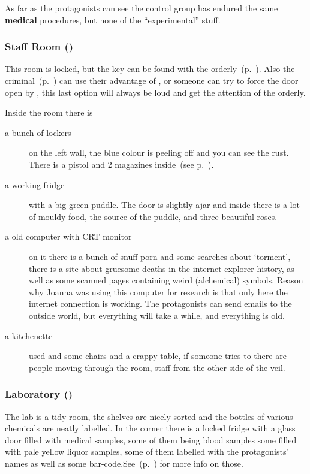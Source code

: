 \documentclass[bg-full]{resources/stylesheets/kult}
\begin{document}
As far as the protagonists can see the control group has endured the same \textbf{medical} procedures, but none of the
“experimental” stuff.

\subsubsection{Staff Room (\faLock)}%
\label{ssub:staff_room}

This room is locked, but the key can be found with the \hyperref[ssub:orderly]{orderly}~(p.~\pageref{ssub:orderly}).  Also the
criminal~(p.~\pageref{sub:the_criminal}) can use their advantage of , or someone can try to force the door open
by , this last option will always be loud and get the attention of the orderly.

Inside the room there is
\begin{description}
  \item[a bunch of lockers] on the left wall, the blue colour is peeling off and you can see the rust.  There is a pistol and 2
        magazines inside~(see p.~\pageref{pistol}).
  \item[a working fridge] with a big green puddle.  The door is slightly ajar and inside there is a lot of mouldy food,
        the source of the puddle, and three beautiful roses.
  \item[a old computer with CRT monitor] on it there is a bunch of snuff porn and some searches about ‘torment’, there is a
        site about gruesome deaths in the internet explorer history, as well as some scanned pages containing weird (alchemical)
        symbols.  Reason why Joanna was using this computer for research is that only here the internet connection is working.  The
        protagonists can send emails to the outside world, but everything will take a while, and everything is old.
  \item[a kitchenette] used and some chairs and a crappy table, if someone tries to 
        there are people moving through the room, staff from the other side of the veil.
\end{description}

\subsubsection{Laboratory (\faLock)}%
\label{ssub:laboratory}

The lab is a tidy room, the shelves are nicely sorted and the bottles of various chemicals are neatly labelled.  In the corner there
is a locked fridge with a glass door filled with medical samples, some of them being blood samples some filled with pale yellow liquor
samples, some of them labelled with the protagonists' names as well as some bar-code.See~(p.~\pageref{ssub:vials}) for more info on those.
\end{document}
